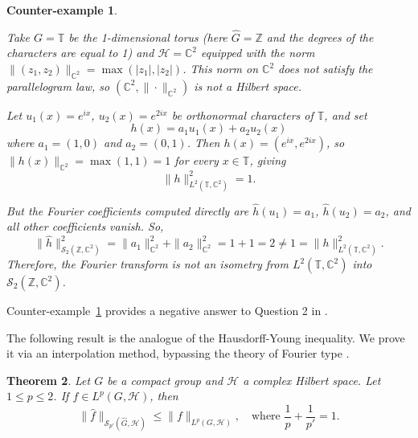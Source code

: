 \documentclass[11pt]{amsart}
\newtheorem{theorem}{Theorem}[section]
\newtheorem{counterexample}[theorem]{Counter-example}
\begin{document}
\begin{counterexample}\label{ex:planch-fails-Cstar}{\rm
Take $G=\mathbb T$ be the 1-dimensional torus (here $\widehat{G}=\mathbb Z$ and the degrees of the characters are equal to 1)  and $\mathcal{H}=\mathbb C^2$ equipped with
the norm $\|(z_1,z_2)\|_{\mathbb C^2}=\max(|z_1|,|z_2|)$. This norm on $\mathbb C^2$ does not satisfy the parallelogram law, so $\left(\mathbb C^2,\|\cdot\|_{\mathbb C^2} \right)$ is not a Hilbert space. 

Let $u_1(x)=e^{ix}$, $u_2(x)=e^{2ix}$ be orthonormal characters of
$\mathbb T$, and set
$$
h(x)=a_1u_1(x)+a_2u_2(x)$$
where $a_1=(1,0)$ and $a_2=(0,1)$.
Then $h(x)=(e^{ix},e^{2ix})$, so $\|h(x)\|_{\mathbb C^2}=\max(1,1)=1$ for every $x\in\mathbb T$,
giving
\[
\|h\|_{L^2(\mathbb T,\mathbb C^2)}^2=1.
\]

\noindent But  the Fourier coefficients computed directly are $\widehat h(u_1)=a_1$, $\widehat h(u_2)=a_2$,
and all other coefficients vanish. So, 
\[
\|\widehat h\|_{\mathscr{S}_2(\mathbb Z,\mathbb C^2)}^2=\|a_1\|_{\mathbb C^2}^2+\|a_2\|_{\mathbb C^2}^2=1+1=2\neq 1
=\|h\|_{L^2(\mathbb T,\mathbb C^2)}^2.
\]
 Therefore, the  Fourier transform is not
an isometry from $L^2(\mathbb T,\mathbb C^2)$ into $\mathscr{S}_2(\mathbb Z,\mathbb C^2)$. 
}\end{counterexample}
Counter-example~\ref{ex:planch-fails-Cstar}  provides a negative answer to Question 2 in \cite{Mensah2024}. 

\smallskip

The following result is the analogue of the Hausdorff-Young inequality. We prove it via an interpolation method, bypassing the theory of Fourier type \cite{GarciaRubio, Peetre}.

\begin{theorem}\label{prop:HY-final}
Let $G$  be a compact group and  $\mathcal{H}$ a complex Hilbert space. Let   $1\le p\le 2$. If $f\in L^p(G,\mathcal{H})$, then
\[
\|\widehat f\|_{\mathscr{S}_{p'}(\widehat{G},\mathcal{H})}\le\|f\|_{L^p(G,\mathcal{H})},\quad\text{where }
\frac1p+\frac1{p'}=1.
\]
\end{theorem}
\end{document}
